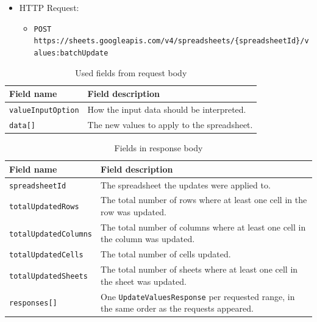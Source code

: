 \documentclass[a4paper,12pt]{report}
\begin{document}
\begin{itemize}
    \item HTTP Request:
        \begin{itemize}
            \item {\small \texttt{POST https://sheets.googleapis.com/v4/spreadsheets/\{spreadsheetId\}/values:batchUpdate}}
        \end{itemize}
\end{itemize}

\begin{table}[H]
\center
\begin{tabularx}{\linewidth}{|X|X|}
    \hline
    \textbf{Field name} & \textbf{Field description} \\
    \hline
    \texttt{valueInputOption} & How the input data should be interpreted. \\
    \hline
    \texttt{data[]} & The new values to apply to the spreadsheet. \\
    \hline
\end{tabularx}
\caption{Used fields from request body}
\label{fieldtable}
\end{table}

\begin{table}[H]
\center
\begin{tabularx}{\linewidth}{|X|X|}
    \hline
    \textbf{Field name} & \textbf{Field description} \\
    \hline
    \texttt{spreadsheetId} &
    The spreadsheet the updates were applied to. \\
    \hline
    \texttt{totalUpdatedRows} &
    The total number of rows where at least one cell in the row was updated. \\
    \hline
    \texttt{totalUpdatedColumns} &
    The total number of columns where at least one cell in the column was
    updated. \\
    \hline
    \texttt{totalUpdatedCells} &
    The total number of cells updated. \\
    \hline
    \texttt{totalUpdatedSheets} &
    The total number of sheets where at least one cell in the sheet was
    updated. \\
    \hline
    \texttt{responses[]} &
    One \texttt{UpdateValuesResponse} per requested range, in the same order as the
    requests appeared. \\
    \hline
\end{tabularx}
\caption{Fields in response body}
\label{fieldtable}
\end{table}
\end{document}
